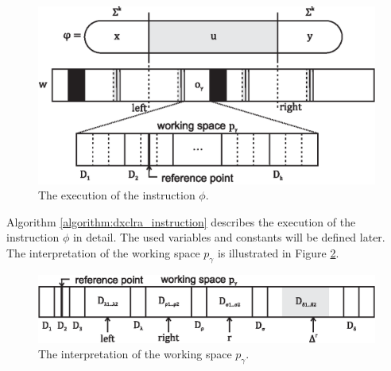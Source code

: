\begin{figure}[htp]
\centering
\includegraphics[scale=1.0]{instruction_and_tape.eps}
\caption[The execution of the instruction $\phi$.]
{The execution of the instruction $\phi$.}
\label{figure:instruction_and_tape}
\end{figure}

Algorithm \ref{algorithm:dxclra_instruction} describes the execution of the instruction $\phi$ in detail. The used variables and constants will be defined later. The interpretation of the working space $p_{\gamma}$ is illustrated in Figure \ref{figure:working_space_detail}.

\begin{figure}[htp]
\centering
\includegraphics[scale=1.0]{working_space_detail.eps}
\caption[The interpretation of the working space $p_{\gamma}$.]
{The interpretation of the working space $p_{\gamma}$.}
\label{figure:working_space_detail}
\end{figure}

